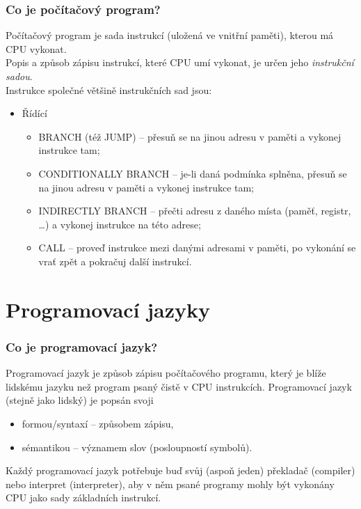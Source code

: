 \documentclass[aspectratio=169,11pt,svgnames]{beamer}
\begin{document}
\begin{frame}
 \frametitle{Co je počítačový program?}
 Počítačový program je sada instrukcí (uložená ve vnitřní paměti), kterou má CPU
 vykonat.\\
 Popis a způsob zápisu instrukcí, které CPU umí vykonat, je určen jeho
 \emph{instrukční sadou}.\\
 Instrukce společné většině instrukčních sad jsou:
 \begin{itemize}
  \item \alert{Řídící}
  \begin{itemize}
   \item \alert{BRANCH} (též \alert{JUMP}) -- přesuň se na jinou adresu v paměti
    a vykonej instrukce tam;
   \pause
   \item \alert{CONDITIONALLY BRANCH} -- je-li daná podmínka splněna, přesuň se
    na jinou adresu v paměti a vykonej instrukce tam;
   \pause
   \item \alert{INDIRECTLY BRANCH} -- přečti adresu z daného místa
    (paměť, registr, \dots) a vykonej instrukce na této adrese;
   \pause
   \item \alert{CALL} -- proveď instrukce mezi danými adresami v paměti, po
    vykonání se vrať zpět a pokračuj další instrukcí.
  \end{itemize}
 \end{itemize}
\end{frame}

\section{Programovací jazyky}

\begin{frame}
 \frametitle{Co je programovací jazyk?}
 Programovací jazyk je způsob zápisu počítačového programu, který je blíže
 lidskému jazyku než program psaný čistě v CPU instrukcích.
 \pause
 Programovací jazyk (stejně jako lidský) je popsán svoji
 \begin{itemize}
  \item \alert{formou/syntaxí} -- způsobem zápisu,
  \pause
  \item \alert{sémantikou} -- významem slov (posloupností symbolů).
 \end{itemize}
 \pause
 Každý programovací jazyk potřebuje buď svůj (aspoň jeden) \alert{překladač}
 (compiler) nebo \alert{interpret} (interpreter), aby v něm psané programy mohly
 být vykonány CPU jako sady základních instrukcí.
\end{frame}
\end{document}
